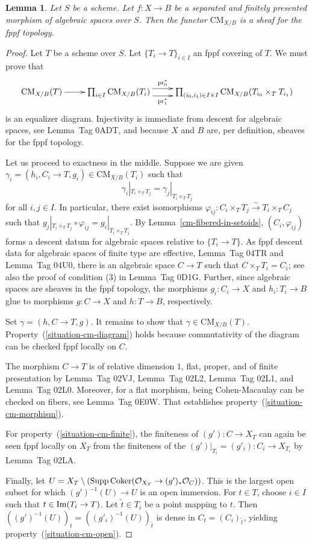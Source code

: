 \documentclass{stacks-project}
\theoremstyle{plain}
\newtheorem{lemma}[subsection]{Lemma}
\theoremstyle{definition}
\theoremstyle{remark}
\numberwithin{equation}{subsection}
\def\Im{\mathop{\rm Im}}
\def\Coker{\mathop{\rm Coker}}
\def\CMfunctor{\text{CM}}
\begin{document}
\begin{lemma}
Let $S$ be a scheme.
Let $f \colon X \to B$ be a separated and finitely presented morphism of algebraic spaces over $S$.
Then the functor $\CMfunctor_{X/B}$ is a sheaf for the fppf topology.
\end{lemma}
\begin{proof}
Let $T$ be a scheme over $S$.
Let $\{ T_i \to T \}_{i \in I}$ an fppf covering of $T$.
We must prove that
\[ \xymatrix{
  \CMfunctor_{X/B}(T) \ar[r] & \prod\nolimits_{i\in I} \CMfunctor_{X/B}(T_i) \ar@<1ex>[r]^-{\text{pr}_0^*} \ar@<-1ex>[r]_-{\text{pr}_1^*} & \prod\nolimits_{(i_0, i_1) \in I \times I} \CMfunctor_{X/B}(T_{i_0} \times_T T_{i_1})
} \]
is an equalizer diagram.
Injectivity is immediate from descent for algebraic spaces, see Lemma~Tag 0ADT, and because $X$ and $B$ are, per definition, sheaves for the fppf topology.

Let us proceed to exactness in the middle.
Suppose we are given $\gamma_i = (h_i,C_i \to T,g_i) \in \CMfunctor_{X/B}(T_i)$ such that 
\[ \gamma_i|_{T_i \times_T T_j} = \gamma_j|_{T_i \times_T T_j} \]
for all $i,j \in I$.
In particular, there exist isomorphisms $\varphi_{ij} \colon C_i \times_T T_j \xrightarrow{\sim} T_i \times_T C_j$ such that $g_j|_{T_i \times_T T_j} \circ \varphi_{ij} = g_i|_{T_i \times_T T_j}$.
By Lemma~\ref{cm-fibered-in-setoids}, $(C_i,\varphi_{ij})$ forms a descent datum for algebraic spaces relative to $\{T_i \to T\}$.
As fppf descent data for algebraic spaces of finite type are effective, Lemma~Tag 04TR and Lemma~Tag 04U0, there is an algebraic space $C \to T$ such that $C \times_T T_i = C_i$; see also the proof of condition (3) in Lemma~Tag 0D1G.
Further, since algebraic spaces are sheaves in the fppf topology, the morphisms $g_i \colon C_i \to X$ and $h_i \colon T_i \to B$ glue to morphisms $g \colon C \to X$ and $h \colon T \to B$, respectively.

Set $\gamma = (h,C\to T,g)$.
It remains to show that $\gamma \in \CMfunctor_{X/B}(T)$.
Property~(\ref{situation-cm-diagram}) holds because commutativity of the diagram can be checked fppf locally on $C$.

The morphism $C \to T$ is of relative dimension $1$, flat, proper, and of finite presentation by Lemma~Tag 02VJ, Lemma~Tag 02L2, Lemma~Tag 02L1, and Lemma~Tag 02L0.
Moreover, for a flat morphism, being Cohen-Macaulay can be checked on fibers, see Lemma~Tag 0E0W. That establishes property~(\ref{situation-cm-morphism}).

For property~(\ref{situation-cm-finite}), the finiteness of $(g') \colon C \to X_T$ can again be seen fppf locally on $X_T$ from the finiteness of the $(g')|_{T_i} = (g'_i) \colon C_i \to X_{T_i}$ by Lemma~Tag 02LA.

Finally, let $U = X_T \setminus (\text{Supp}\Coker(\mathcal{O}_{X_T} \to (g')_*\mathcal{O}_C))$.
This is the largest open subset for which $(g')^{-1}(U) \to U$ is an open immersion.
For $t \in T$, choose $i \in I$ such that $t \in \Im(T_i \to T)$.
Let $\tilde{t} \in T_i$ be a point mapping to $t$.
Then $((g')^{-1}(U))_t = ((g'_i)^{-1}(U))_{\tilde{t}}$ is dense in $C_t = (C_{i})_{\tilde{t}}$, yielding property~(\ref{situation-cm-open}).
\end{proof}
\end{document}
